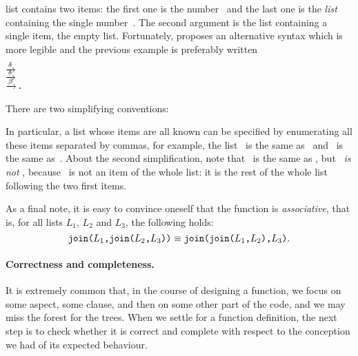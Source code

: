 list contains two items: the first one is the number~ and
the last one is the \emph{list} containing the single
number~. The second argument is the list containing a
single item, the empty list. Fortunately, \Erlang proposes an
alternative syntax which is more legible and the previous example is
preferably written
\begin{alltt}
 \(\smashedrightarrow{\delta}\) 
                   \(\smashedrightarrow{\delta}\) 
                   \(\smashedrightarrow{\beta}\) \erlcode{[3,[4],[]]}\textrm{.}
\end{alltt}
There are two simplifying conventions:
In particular, a list whose items are all known can be specified by
enumerating all these items separated by commas, for example, the list
~is the same as~\erlcode{[3,1,0]} and
\erlcode{[5|[]]}~is the same as~\erlcode{[5]}. About the second
simplification, note that \erlcode{[3|[1|L]]}~is the same as
\erlcode{[3,1|L]}, but \erlcode{[3|[1|L]]}~\emph{is not}
\erlcode{[3,1,L]}, because ~is not an item of the whole
list: it is the rest of the whole list following the two first items.

As a final note, it is easy to convince oneself that the function
 is \emph{associative}, that is, for all lists
\(L_1\), \(L_2\) and \(L_3\), the following holds:
\[
  \texttt{join(\(L_1\),join(\(L_2\),\(L_3\)))} \mathrel{\equiv}
  \texttt{join(join(\(L_1\),\(L_2\)),\(L_3\))}.
\]

\medskip

\paragraph{Correctness and completeness.}
\label{correctness}

It is extremely common that, in the course of designing a function, we
focus on some aspect, some clause, and then on some other part of the
code, and we may miss the forest for the trees. When we settle for a
function definition, the next step is to check whether it is correct
and complete with respect to the conception we had of its expected
behaviour.

